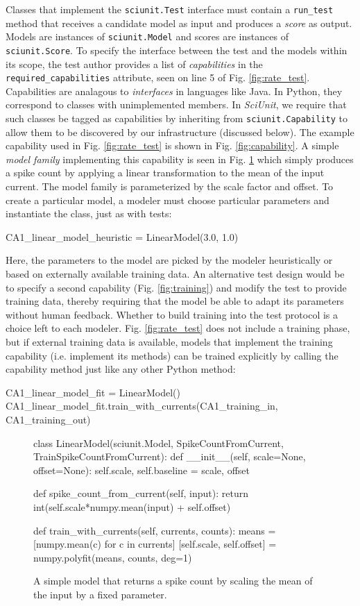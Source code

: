 \documentclass[11pt,letterpaper]{article}
\let\verbx\lstinline
\begin{document}
Classes that implement the \verbx{sciunit.Test} interface must contain a \verbx{run_test} method that receives a candidate model as input and produces a \textit{score} as output. Models are instances of \verbx{sciunit.Model} and scores are instances of \verbx{sciunit.Score}. To specify the interface between the test and the models within its scope, the test author provides a list of \emph{capabilities} in the \verbx{required_capabilities} attribute, seen on line 5 of Fig. \ref{fig:rate_test}. Capabilities are analagous to \emph{interfaces} in languages like Java. In Python, they correspond to classes with unimplemented members. In \textit{SciUnit}, we require that such classes be tagged as capabilities by inheriting from \verbx{sciunit.Capability} to allow them to be discovered by our infrastructure (discussed below). The example capability used in Fig. \ref{fig:rate_test} is shown in Fig. \ref{fig:capability}. A simple \emph{model family} implementing this capability is seen in Fig. \ref{fig:simple_model} which simply produces a spike count by applying a linear transformation to the mean of the input current. The model family is parameterized by the scale factor and offset. To create a particular model, a modeler must choose particular parameters and instantiate the class, just as with tests:
\begin{python}
CA1_linear_model_heuristic = LinearModel(3.0, 1.0)
\end{python}
Here, the parameters to the model are picked by the modeler heuristically or based on externally available training data. An alternative test design would be to specify a second capability (Fig. \ref{fig:training}) and modify the test to provide training data, thereby requiring that the model be able to adapt its parameters without human feedback. Whether to build training into the test protocol is a choice left to each modeler. Fig. \ref{fig:rate_test} does not include a training phase, but if external training data is available, models that implement the training capability (i.e. implement its methods) can be trained explicitly by calling the capability method just like any other Python method:
\begin{python}
CA1_linear_model_fit = LinearModel()
CA1_linear_model_fit.train_with_currents(CA1_training_in, CA1_training_out)
\end{python}
\begin{figure}
\begin{python}
class LinearModel(sciunit.Model, SpikeCountFromCurrent, 
    TrainSpikeCountFromCurrent):
  def __init__(self, scale=None, offset=None): 
    self.scale, self.baseline = scale, offset
    
  def spike_count_from_current(self, input):
    return int(self.scale*numpy.mean(input) + self.offset)

  def train_with_currents(self, currents, counts):
    means = [numpy.mean(c) for c in currents]
    [self.scale, self.offset] = numpy.polyfit(means, counts, deg=1)    
\end{python}
\caption{A simple model that returns a spike count by scaling the mean of the input by a fixed parameter.}
\label{fig:simple_model}
\end{figure}
\end{document}
